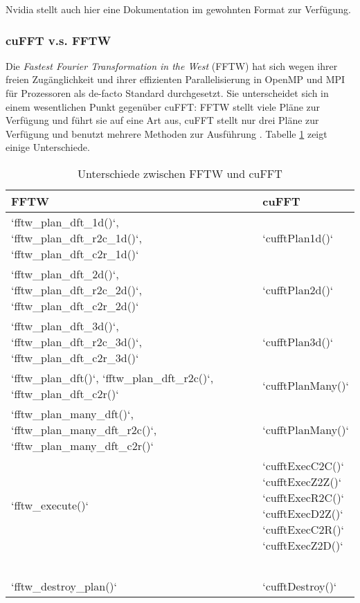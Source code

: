 		Nvidia stellt auch hier eine Dokumentation im gewohnten Format zur Verfügung. \autocite{cufftDoc}
	
		 	\subsubsection{cuFFT v.s. FFTW}\label{fftw}
		 	Die \textit{Fastest Fourier Transformation in the West} (FFTW) hat sich wegen ihrer freien Zugänglichkeit und ihrer effizienten Parallelisierung in OpenMP und MPI für Prozessoren als de-facto Standard durchgesetzt. Sie unterscheidet sich in einem wesentlichen Punkt gegenüber cuFFT: FFTW stellt viele Pläne zur Verfügung und führt sie auf eine Art aus, cuFFT stellt nur drei Pläne zur Verfügung und benutzt mehrere Methoden zur Ausführung \autocite{FFTW05}. Tabelle \ref{tab6:fftw} zeigt einige Unterschiede.
		 	\begin{table}[h]
		 	\centering
		 	\begin{tabular}{ll}
		 		\toprule
		 		FFTW & cuFFT \\ \midrule
		 		\li`fftw_plan_dft_1d()`, \li`fftw_plan_dft_r2c_1d()`, \li`fftw_plan_dft_c2r_1d()` & \li`cufftPlan1d()` \\
		 		\li`fftw_plan_dft_2d()`, \li`fftw_plan_dft_r2c_2d()`, \li`fftw_plan_dft_c2r_2d()` & \li`cufftPlan2d()` \\
		 		\li`fftw_plan_dft_3d()`, \li`fftw_plan_dft_r2c_3d()`, \li`fftw_plan_dft_c2r_3d()` & \li`cufftPlan3d()` \\
		 		\li`fftw_plan_dft()`, \li`fftw_plan_dft_r2c()`, \li`fftw_plan_dft_c2r()` & \li`cufftPlanMany()` \\
		 		\li`fftw_plan_many_dft()`, \li`fftw_plan_many_dft_r2c()`, \li`fftw_plan_many_dft_c2r()` & \li`cufftPlanMany()` \\
		 		\li`fftw_execute()` & \multirowcell{6}{\li`cufftExecC2C()`\\ \li`cufftExecZ2Z()`\\ \li`cufftExecR2C()`\\ \li`cufftExecD2Z()`\\ \li`cufftExecC2R()`\\ \li`cufftExecZ2D()`} \\
		 		& \\
		 		& \\
		 		& \\
		 		& \\
		 		& \\
		 		\li`fftw_destroy_plan()` & \li`cufftDestroy()` \\ \bottomrule
		 	\end{tabular}
		 	\caption[cuFFT v.s. FFTW]{Unterschiede zwischen FFTW und cuFFT}
		 	\label{tab6:fftw}
		 	\end{table}
		 	
